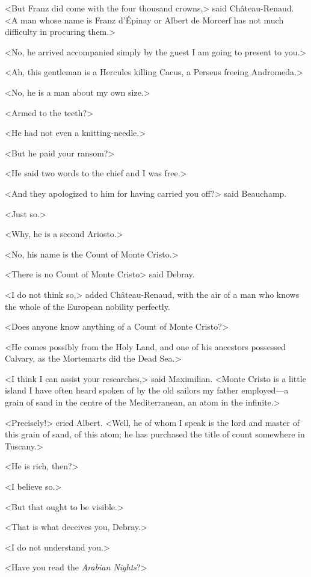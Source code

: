  <But Franz did come with the four thousand crowns,> said Château-Renaud. <A man whose name is Franz d'Épinay or Albert de Morcerf has not much difficulty in procuring them.> 

 <No, he arrived accompanied simply by the guest I am going to present to you.> 

 <Ah, this gentleman is a Hercules killing Cacus, a Perseus freeing Andromeda.> 

 <No, he is a man about my own size.> 

 <Armed to the teeth?> 

 <He had not even a knitting-needle.> 

 <But he paid your ransom?> 

 <He said two words to the chief and I was free.> 

 <And they apologized to him for having carried you off?> said Beauchamp. 

 <Just so.> 

 <Why, he is a second Ariosto.> 

 <No, his name is the Count of Monte Cristo.> 

 <There is no Count of Monte Cristo> said Debray. 

 <I do not think so,> added Château-Renaud, with the air of a man who knows the whole of the European nobility perfectly. 

 <Does anyone know anything of a Count of Monte Cristo?> 

 <He comes possibly from the Holy Land, and one of his ancestors possessed Calvary, as the Mortemarts did the Dead Sea.> 

 <I think I can assist your researches,> said Maximilian. <Monte Cristo is a little island I have often heard spoken of by the old sailors my father employed—a grain of sand in the centre of the Mediterranean, an atom in the infinite.> 

 <Precisely!> cried Albert. <Well, he of whom I speak is the lord and master of this grain of sand, of this atom; he has purchased the title of count somewhere in Tuscany.> 

 <He is rich, then?> 

 <I believe so.> 

 <But that ought to be visible.> 

 <That is what deceives you, Debray.> 

 <I do not understand you.> 

 <Have you read the \textit{Arabian Nights}?> 

